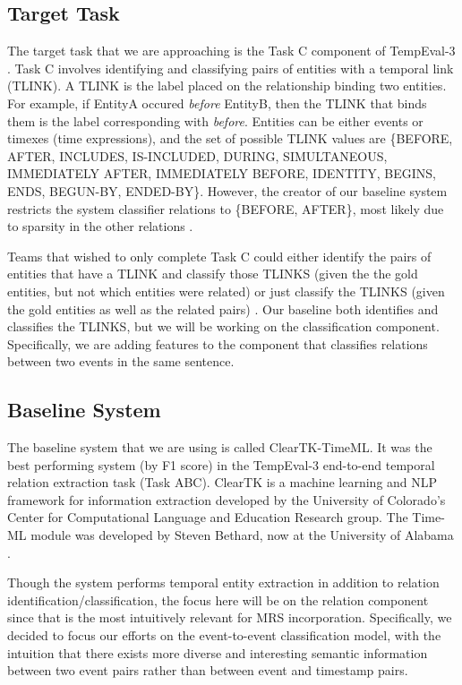 \documentclass[11pt]{article}
\begin{document}
\subsection{Target Task}

The target task that we are approaching is the Task C component of TempEval-3 \cite{UzZaman:13}. Task C involves identifying and classifying pairs of entities with a temporal link (TLINK). A TLINK is the label placed on the relationship binding two entities. For example, if EntityA occured \textit{before} EntityB, then the TLINK that binds them is the label corresponding with \textit{before}. Entities can be either events or timexes (time expressions), and the set of possible TLINK values are \{BEFORE, AFTER, INCLUDES, IS-INCLUDED, DURING, SIMULTANEOUS, IMMEDIATELY AFTER, IMMEDIATELY BEFORE, IDENTITY, BEGINS, ENDS, BEGUN-BY, ENDED-BY\}. However, the creator of our baseline system restricts the system classifier relations to \{BEFORE, AFTER\}, most likely due to sparsity in the other relations \cite{Bethard:13}.

Teams that wished to only complete Task C could either identify the pairs of entities that have a TLINK and classify those TLINKS (given the the gold entities, but not which entities were related) or just classify the TLINKS (given the gold entities as well as the related pairs) \cite{UzZaman:13}. Our baseline both identifies and classifies the TLINKS, but we will be working on the classification component. Specifically, we are adding features to the component that classifies relations between two events in the same sentence.

\subsection{Baseline System}

The baseline system that we are using is called ClearTK-TimeML. It was the best performing system (by F1 score) in the TempEval-3 end-to-end temporal relation extraction task (Task ABC). ClearTK is a machine learning and NLP framework for information extraction developed by the University of Colorado's Center for Computational Language and Education Research group. The Time-ML module was developed by Steven Bethard, now at the University of Alabama \cite{Bethard:14}.

Though the system performs temporal entity extraction in addition to relation identification/classification, the focus here will be on the relation component since that is the most intuitively relevant for MRS incorporation.  Specifically, we decided to focus
our efforts on the event-to-event classification
model, with the intuition that there exists more
diverse and interesting semantic information between
two event pairs rather than between event
and timestamp pairs. 
\end{document}
